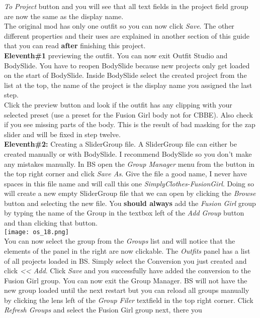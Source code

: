 \textit{To Project} button and you will see that all text fields in the project field group are now the same as the display name.\\
The original mod has only one outfit so you can now click \textit{Save}. The other different properties and their uses are explained 
in another section of this guide that you can read \textbf{after} finishing this project.\\
\textbf{Eleventh\#1} previewing the outfit. You can now exit Outfit Studio and BodySlide. You have to reopen BodySlide because new projects 
only get loaded on the start of BodySlide. Inside BodySlide select the created project from the list at the top, the name of the project is 
the display name you assigned the last step.\\
Click the preview button and look if the outfit has any clipping with your selected preset (use a preset for the Fusion Girl body not for CBBE).
Also check if you see missing parts of the body. This is the result of bad masking for the zap slider and will be fixed in step twelve.\\
\textbf{Eleventh\#2:} Creating a SliderGroup file. A SliderGroup file can either be created manually or with BodySlide. I recommend 
BodySlide so you don't make any mistakes manually. In BS open the \textit{Group Manager} menu from the button in the top right corner 
and click \textit{Save As}. Give the file a good name, I never have spaces in this file name and will call this one 
\textit{SimplyClothes-FusionGirl}. Doing so will create a new empty SliderGroup file that we can open by clicking the \textit{Browse} 
button and selecting the new file. You \textbf{should always} add the \textit{Fusion Girl} group by typing the name of the Group in the 
textbox left of the \textit{Add Group} button and than clicking that button.\\
\texttt{[image: os\_18.png]}\\
You can now select the group from the \textit{Groups} list and will notice that the elements of the panel in the right are now 
clickable. The \textit{Outfits} panel has a list of all projects loaded in BS. Simply select the Conversion you just created and click 
\textit{<< Add}. Click \textit{Save} and you successfully have added the conversion to the Fusion Girl group. You can now exit the Group Manager.
BS will not have the new group loaded until the next restart but you can reload all groups manually by clicking the lens left of the 
\textit{Group Filer} textfield in the top right corner. Click \textit{Refresh Groups} and select the Fusion Girl group next, there you 
